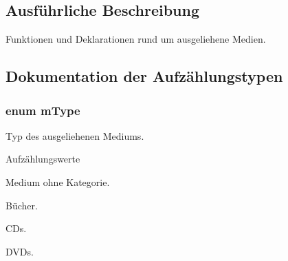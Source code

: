 \subsection{Ausführliche Beschreibung}
Funktionen und Deklarationen rund um ausgeliehene Medien. 



\subsection{Dokumentation der Aufzählungstypen}
\subsubsection[{\texorpdfstring{m\+Type}{mType}}]{\setlength{\rightskip}{0pt plus 5cm}enum {\bf m\+Type}}\hypertarget{group___lend_lib_item_ga636cfca014f3212ea82d45e28f9cb51b}{}\label{group___lend_lib_item_ga636cfca014f3212ea82d45e28f9cb51b}


Typ des ausgeliehenen Mediums. 

\begin{Desc}
\item[Aufzählungswerte]\par
\begin{description}
\item[{\em 
other\hypertarget{group___lend_lib_item_gga636cfca014f3212ea82d45e28f9cb51ba7e338ad381a84ef6df07e7d425707025}{}\label{group___lend_lib_item_gga636cfca014f3212ea82d45e28f9cb51ba7e338ad381a84ef6df07e7d425707025}
}]Medium ohne Kategorie. \item[{\em 
book\hypertarget{group___lend_lib_item_gga636cfca014f3212ea82d45e28f9cb51ba6053cbf2a0d801307c80aec065560db6}{}\label{group___lend_lib_item_gga636cfca014f3212ea82d45e28f9cb51ba6053cbf2a0d801307c80aec065560db6}
}]Bücher. \item[{\em 
cd\hypertarget{group___lend_lib_item_gga636cfca014f3212ea82d45e28f9cb51bae7dab93ee81e7f74327bed188e6f3748}{}\label{group___lend_lib_item_gga636cfca014f3212ea82d45e28f9cb51bae7dab93ee81e7f74327bed188e6f3748}
}]C\+Ds. \item[{\em 
dvd\hypertarget{group___lend_lib_item_gga636cfca014f3212ea82d45e28f9cb51ba9250e48899d18438f51e7df957e35ea5}{}\label{group___lend_lib_item_gga636cfca014f3212ea82d45e28f9cb51ba9250e48899d18438f51e7df957e35ea5}
}]D\+V\+Ds. \end{description}
\end{Desc}



